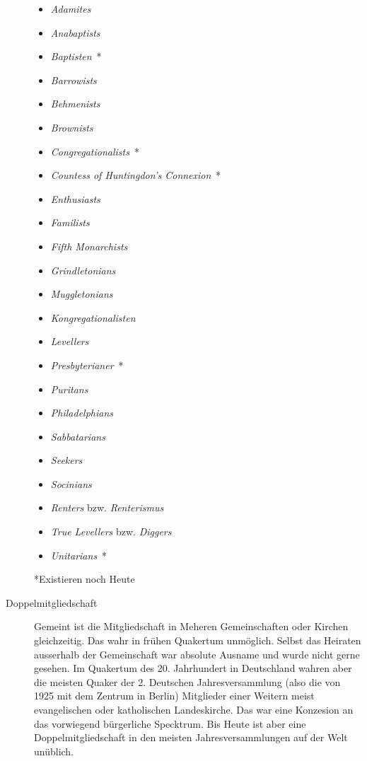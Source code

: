 \begin{description}
\begin{itemize}
 \item \textit{Adamites}
 \item \textit{Anabaptists}
 \item \textit{Baptisten}~*
 \item \textit{Barrowists}
 \item \textit{Behmenists}
 \item \textit{Brownists}
 \item \textit{Congregationalists}~*
 \item \textit{Countess of Huntingdon's Connexion}~*
 \item \textit{Enthusiasts}
 \item \textit{Familists}
 \item \textit{Fifth Monarchists}
 \item \textit{Grindletonians}
 \item \textit{Muggletonians}
 \item \textit{Kongregationalisten}
 \item \textit{Levellers}
 \item \textit{Presbyterianer}~*
 \item \textit{Puritans}
 \item \textit{Philadelphians}
 \item \textit{Sabbatarians}
 \item \textit{Seekers}
 \item \textit{Socinians}
 \item \textit{Renters} bzw. \textit{Renterismus}
 \item \textit{True Levellers} bzw. \textit{Diggers}
 \item \textit{Unitarians}~*
\end{itemize}
*Existieren noch Heute

 \item[Doppelmitgliedschaft] Gemeint ist die Mitgliedschaft in Meheren Gemeinschaften
 oder Kirchen gleichzeitig. Das wahr in frühen Quakertum unmöglich. Selbst das
 Heiraten
 ausserhalb der Gemeinschaft war absolute Ausname und wurde nicht gerne gesehen. Im
 Quakertum des 20. Jahrhundert in Deutschland wahren aber die meisten Quaker der 2.
 Deutschen Jahresversammlung (also die von 1925 mit dem Zentrum in Berlin) Mitglieder
 einer Weitern meist evangelischen oder katholischen Landeskirche. Das war eine
 Konzesion an das vorwiegend bürgerliche Specktrum. Bis Heute ist aber eine
 Doppelmitgliedschaft in den meisten Jahresversammlungen auf der Welt unüblich.


\end{description}
